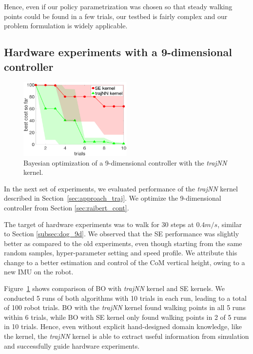Hence, even if our policy parametrization was chosen so that steady walking points could be found in a few trials, our testbed is fairly complex and our problem formulation is widely applicable. 


\subsection{Hardware experiments with a 9-dimensional controller}

\begin{figure}
    \centering
    \includegraphics[width = 0.5\textwidth]{img/9d_hdw_nn.png}
    \caption{Bayesian optimization of a 9-dimensional controller with the \textit{trajNN} kernel.}
    \label{fig:9d_hdw_nn}
\end{figure}
In the next set of experiments, we evaluated performance of the \textit{trajNN} kernel described in Section~\ref{sec:approach_traj}. We optimize the 9-dimensional controller from Section \ref{sec:raibert_cont}. 

The target of hardware experiments was to walk for 30 steps at $0.4m/s$, similar to Section \ref{subsec:dog_9d}. We observed that the SE performance was slightly better as compared to the old experiments, even though starting from the same random samples, hyper-parameter setting and speed profile. We attribute this change to a better estimation and control of the CoM vertical height, owing to a new IMU on the robot. 


Figure~\ref{fig:9d_hdw_nn} shows comparison of BO with \textit{trajNN} kernel and SE kernels. We conducted 5 runs of both algorithms with 10 trials in each run, leading to a total of 100 robot trials. BO with the \textit{trajNN} kernel found walking points in all 5 runs within 6 trials, while BO with SE kernel only found walking points in 2 of 5 runs in 10 trials.
Hence, even without explicit hand-designed domain knowledge, like the \dogkernel kernel, the \textit{trajNN} kernel is able to extract useful information from simulation and successfully guide hardware experiments.


